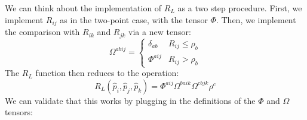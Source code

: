 \documentclass{article}
\begin{document}
We can think about the implementation of $R_L$ as a two step procedure. First, we implement $R_{ij}$ as in the two-point case, with the tensor $\Phi$. Then, we implement the comparison with $R_{ik}$ and $R_{jk}$ via a new tensor:
\begin{equation}
    \Omega^{a b ij} = \begin{cases} 
        \delta_{ab} & R_{ij} \leq \rho_b \\
        \Phi^{a ij} & R_{ij} > \rho_b
    \end{cases}
\end{equation}
The $R_L$ function then reduces to the operation:
\begin{equation}
    R_L(\hat{p}_{i}, \hat{p}_{j}, \hat{p}_{k})  = \Phi^{a i j} \Omega^{b a ik} \Omega^{c b jk} \rho^c
\end{equation}
We can validate that this works by plugging in the definitions of the $\Phi$ and $\Omega$ tensors:
\end{document}
